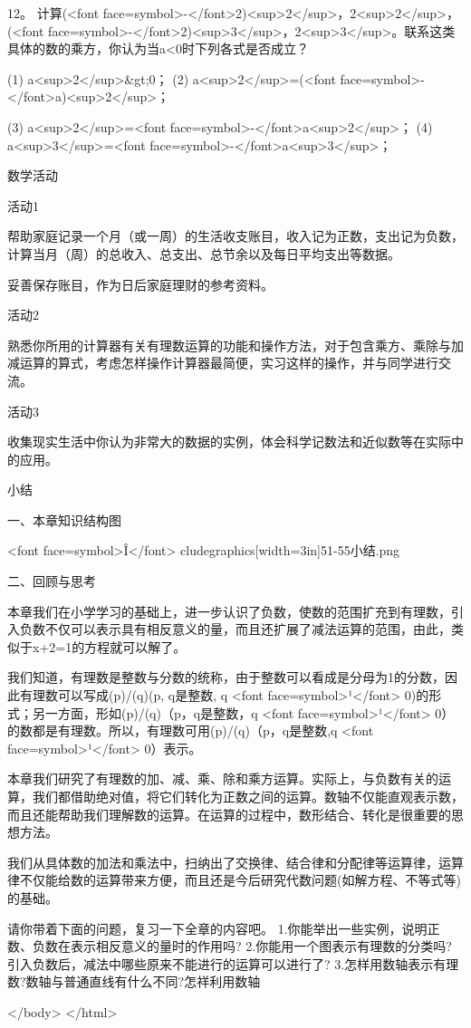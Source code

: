 12。 计算(<font face=symbol>-</font>2)<sup>2</sup>，2<sup>2</sup>，(<font face=symbol>-</font>2)<sup>3</sup>，2<sup>3</sup>。联系这类具体的数的乘方，你认为当a<0时下列各式是否成立？

    (1) a<sup>2</sup>&gt;0；       (2) a<sup>2</sup>=(<font face=symbol>-</font>a)<sup>2</sup>；

    (3) a<sup>2</sup>=<font face=symbol>-</font>a<sup>2</sup>；    (4) a<sup>3</sup>=<font face=symbol>-</font>a<sup>3</sup>；

\endexeicise

数学活动

活动1

帮助家庭记录一个月（或一周）的生活收支账目，收入记为正数，支出记为负数，计算当月（周）的总收入、总支出、总节余以及每日平均支出等数据。

妥善保存账目，作为日后家庭理财的参考资料。

活动2

熟悉你所用的计算器有关有理数运算的功能和操作方法，对于包含乘方、乘除与加减运算的算式，考虑怎样操作计算器最简便，实习这样的操作，并与同学进行交流。

活动3

收集现实生活中你认为非常大的数据的实例，体会科学记数法和近似数等在实际中的应用。

小结

一、本章知识结构图

 <font face=symbol>Î</font> cludegraphics[width=3in]51-55小结.png

二、回顾与思考

本章我们在小学学习的基础上，进一步认识了负数，使数的范围扩充到有理数，引入负数不仅可以表示具有相反意义的量，而且还扩展了减法运算的范围，由此，类似于x+2=1的方程就可以解了。

我们知道，有理数是整数与分数的统称，由于整数可以看成是分母为1的分数，因此有理数可以写成(p)/(q)(p, q是整数, q <font face=symbol>¹</font>  0)的形式；另一方面，形如(p)/(q)（p，q是整数，q <font face=symbol>¹</font> 0）的数都是有理数。所以，有理数可用(p)/(q)（p，q是整数,q  <font face=symbol>¹</font>  0）表示。

本章我们研究了有理数的加、减、乘、除和乘方运算。实际上，与负数有关的运算，我们都借助绝对值，将它们转化为正数之间的运算。数轴不仅能直观表示数，而且还能帮助我们理解数的运算。在运算的过程中，数形结合、转化是很重要的思想方法。

我们从具体数的加法和乘法中，扫纳出了交换律、结合律和分配律等运算律，运算律不仅能给数的运算带来方便，而且还是今后研究代数问题(如解方程、不等式等)的基础。

    请你带着下面的问题，复习一下全章的内容吧。
    1.你能举出一些实例，说明正数、负数在表示相反意义的量时的作用吗?
    2.你能用一个图表示有理数的分类吗?引入负数后，减法中哪些原来不能进行的运算可以进行了?
    3.怎样用数轴表示有理数?数轴与普通直线有什么不同?怎祥利用数轴

\endarticle
\enddocument
</body>
</html>
